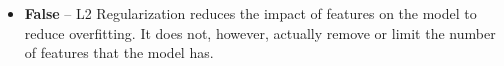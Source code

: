 \begin{itemize}
    \item[] {\bf False} -- L2 Regularization reduces the impact of features on the model to reduce overfitting. It does not, however, actually remove or limit the number of features that the model has. 
\end{itemize}
